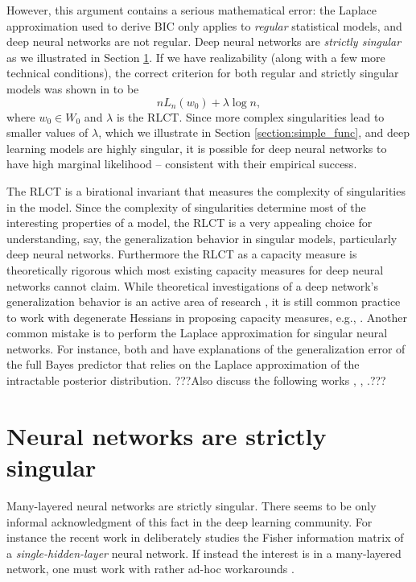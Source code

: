 \documentclass{article} %
\begin{document}
However, this argument contains a serious mathematical error: the Laplace approximation used to derive BIC only applies to \emph{regular} statistical models, and deep neural networks are not regular. Deep neural networks are \textit{strictly singular} as we illustrated in Section \ref{section:nn_singular}. 
If we have realizability (along with a few more technical conditions), the correct criterion for both regular and strictly singular models was shown in \citet{watanabe_widely_2013} to be 
\begin{equation}
nL_n(w_0) + \lambda \log n,
\label{logmarginal_rlct}
\end{equation}
where $w_0 \in W_0$ and $\lambda$ is the RLCT. 
Since more complex singularities lead to smaller values of $\lambda$, which we illustrate in Section \ref{section:simple_func}, and deep learning models are highly singular, it is possible for deep neural networks to have high marginal likelihood -- consistent with their empirical success. 

The RLCT is a birational invariant \citep{kollar_birational_1998} that measures the complexity of singularities in the model. Since the complexity of singularities determine most of the interesting properties of a model, the RLCT is a very appealing choice for understanding, say, the generalization behavior in singular models, particularly deep neural networks. Furthermore the RLCT as a capacity measure is theoretically rigorous which most existing capacity measures for deep neural networks cannot claim. While theoretical investigations of a deep network's generalization behavior is an active area of research \cite{neyshabur_exploring_2017}, it is still common practice to work with degenerate Hessians in proposing capacity measures, e.g., \citet{thomas_information_2019}. Another common mistake is to perform the Laplace approximation for singular neural networks. For instance, both \citet{zhang_energyentropy_2018} and  \citet{le_bayesian_2018} have explanations of the generalization error of the full Bayes predictor that relies on the Laplace approximation of the intractable posterior distribution. ???Also discuss the following works \cite{maddox_rethinking_2020}, \cite{gao_degrees_2016}, \cite{sun_lightlike_2020}.???


\section{Neural networks are strictly singular}
\label{section:nn_singular}
Many-layered neural networks are strictly singular. There seems to be only informal acknowledgment of this fact in the deep learning community. For instance the recent work in \citet{pennington_spectrum_2018} deliberately studies the Fisher information matrix of a \textit{single-hidden-layer} neural network. If instead the interest is in a many-layered network, one must work with rather ad-hoc workarounds  \citep{sun2017relative}.  
\end{document}
